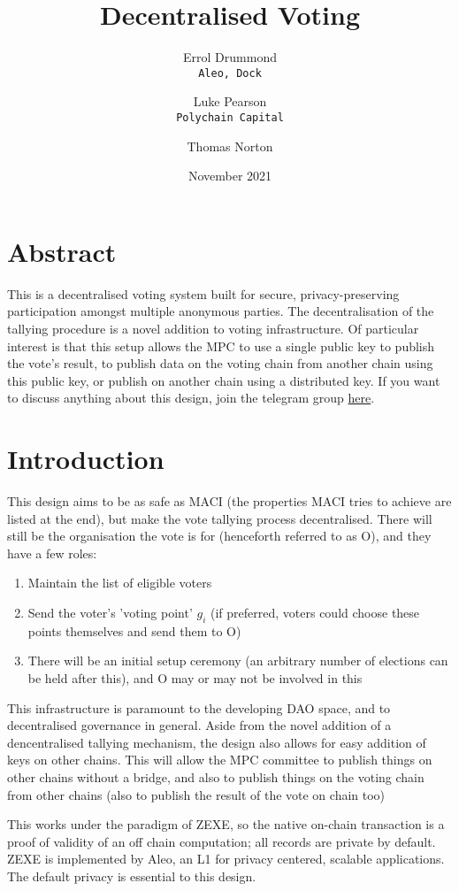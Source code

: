 \documentclass{article}
\title{Decentralised Voting}
\author{Errol Drummond\\ \texttt{Aleo, Dock}\\ \and 
 Luke Pearson\\ \texttt{Polychain Capital} \and
 Thomas Norton}
\date{November 2021}
\begin{document}
\maketitle
\section{Abstract}
This is a decentralised voting system built for secure, privacy-preserving participation amongst multiple anonymous parties. The decentralisation of the tallying procedure is a novel addition to voting infrastructure. Of particular interest is that this setup allows the MPC to use a single public key to publish the vote's result, to publish data on the voting chain from another chain using this public key, or publish on another chain using a distributed key. If you want to discuss anything about this design, join the telegram group \href{https://t.me/joinchat/5tZhfUWRwacwNzZk}{here}.

\section{Introduction}
This design aims to be as safe as MACI (the properties MACI tries to achieve are listed at the end), but make the vote tallying process decentralised. There will still be the organisation the vote is for (henceforth referred to as O), and they have a few roles:
\begin{enumerate}
    \item Maintain the list of eligible voters
    \item Send the voter's 'voting point' $g_i$ (if preferred, voters could choose these points themselves and send them to O)
    \item There will be an initial setup ceremony (an arbitrary number of elections can be held after this), and O may or may not be involved in this
\end{enumerate}

This infrastructure is paramount to the developing DAO space, and to decentralised governance in general. Aside from the novel addition of a dencentralised tallying mechanism, the design also allows for easy addition of keys on other chains. This will allow the MPC committee to publish things on other chains without a bridge, and also to publish things on the voting chain from other chains (also to publish the result of the vote on chain too)

This works under the paradigm of ZEXE, so the native on-chain transaction is a proof of validity of an off chain computation; all records are private by default. ZEXE is implemented by Aleo, an L1 for privacy centered, scalable applications. The default privacy is essential to this design.
\end{document}
